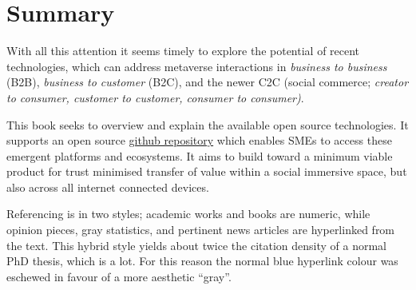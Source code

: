 \section{Summary}
With all this attention it seems timely to explore the potential of recent technologies, which can address metaverse interactions in \textit{business to business} (B2B), \textit{business to customer} (B2C), and the newer C2C (social commerce; \textit{creator to consumer, customer to customer, consumer to consumer\cite{jones2008trust})}. \par %
This book seeks to overview and explain the available open source technologies. It supports an open source \href{https://github.com/flossverse/product}{github repository} which enables SMEs to access these emergent platforms and ecosystems. It aims to build toward a minimum viable product for trust minimised transfer of value within a social immersive space, but also across all internet connected devices.\par
Referencing is in two styles; academic works and books are numeric, while opinion pieces, gray statistics, and pertinent news articles are hyperlinked from the text. This hybrid style yields about twice the citation density of a normal PhD thesis, which is a lot. For this reason the normal blue hyperlink colour was eschewed in favour of a more aesthetic ``gray''. \par%

